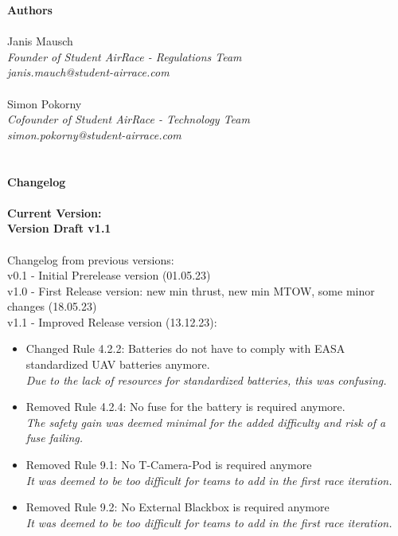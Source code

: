 \documentclass{article}
\newcommand*{\getVersion}{v1.1}
\begin{document}
\tableofcontents{}

\newpage
{\bf Authors}
\\ \\Janis Mausch \emph{\\Founder of Student AirRace - Regulations Team \\janis.mauch@student-airrace.com}
\\ \\ Simon Pokorny \emph{\\Cofounder of Student AirRace - Technology Team \\simon.pokorny@student-airrace.com}
\\ \\ \\
{\bf Changelog}
\\ \\{\bf Current Version: \\Version Draft \getVersion{}}
\\ \\Changelog from previous versions: 
\\ v0.1 - Initial Prerelease version (01.05.23)
\\ v1.0 - First Release version: new min thrust, new min MTOW, some minor changes (18.05.23)
\\ v1.1 - Improved Release version (13.12.23): 
\begin{itemize}
  \item Changed Rule 4.2.2: Batteries do not have to comply with EASA standardized UAV batteries anymore. \emph{\\Due to the lack of resources for standardized batteries, this was confusing.}
  \item Removed Rule 4.2.4: No fuse for the battery is required anymore. \emph{\\The safety gain was deemed minimal for the added difficulty and risk of a fuse failing.}
  \item Removed Rule 9.1: No T-Camera-Pod is required anymore \emph{\\It was deemed to be too difficult for teams to add in the first race iteration.}
  \item Removed Rule 9.2: No External Blackbox is required anymore \emph{\\It was deemed to be too difficult for teams to add in the first race iteration.}
\end{itemize}
\end{document}
